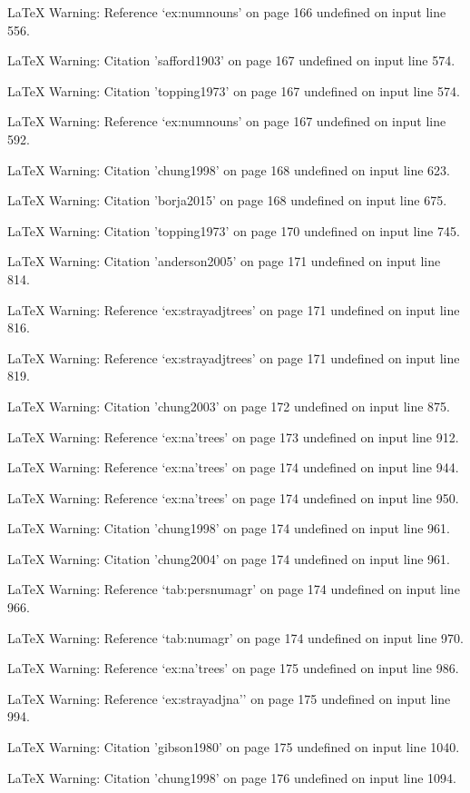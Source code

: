 LaTeX Warning: Reference `ex:numnouns' on page 166 undefined on input line 556.


LaTeX Warning: Citation 'safford1903' on page 167 undefined on input line 574.


LaTeX Warning: Citation 'topping1973' on page 167 undefined on input line 574.


LaTeX Warning: Reference `ex:numnouns' on page 167 undefined on input line 592.


LaTeX Warning: Citation 'chung1998' on page 168 undefined on input line 623.


LaTeX Warning: Citation 'borja2015' on page 168 undefined on input line 675.


LaTeX Warning: Citation 'topping1973' on page 170 undefined on input line 745.


LaTeX Warning: Citation 'anderson2005' on page 171 undefined on input line 814.


LaTeX Warning: Reference `ex:strayadjtrees' on page 171 undefined on input line 816.


LaTeX Warning: Reference `ex:strayadjtrees' on page 171 undefined on input line 819.


LaTeX Warning: Citation 'chung2003' on page 172 undefined on input line 875.


LaTeX Warning: Reference `ex:na'trees' on page 173 undefined on input line 912.


LaTeX Warning: Reference `ex:na'trees' on page 174 undefined on input line 944.


LaTeX Warning: Reference `ex:na'trees' on page 174 undefined on input line 950.


LaTeX Warning: Citation 'chung1998' on page 174 undefined on input line 961.


LaTeX Warning: Citation 'chung2004' on page 174 undefined on input line 961.


LaTeX Warning: Reference `tab:persnumagr' on page 174 undefined on input line 966.


LaTeX Warning: Reference `tab:numagr' on page 174 undefined on input line 970.


LaTeX Warning: Reference `ex:na'trees' on page 175 undefined on input line 986.


LaTeX Warning: Reference `ex:strayadjna'' on page 175 undefined on input line 994.


LaTeX Warning: Citation 'gibson1980' on page 175 undefined on input line 1040.


LaTeX Warning: Citation 'chung1998' on page 176 undefined on input line 1094.



